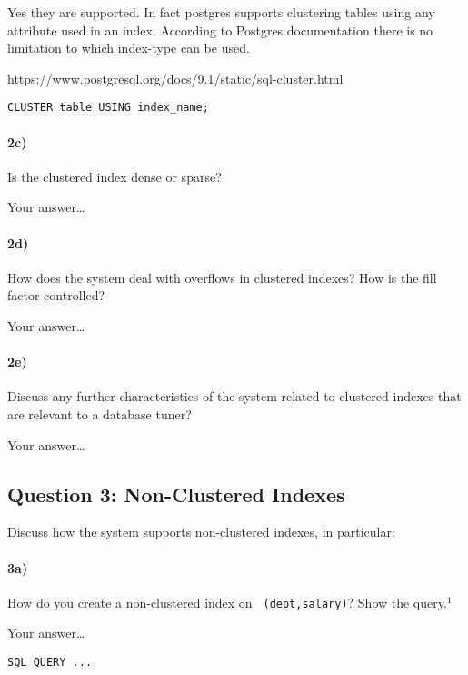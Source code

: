 \documentclass[11pt]{scrartcl}
\begin{document}
Yes they are supported. In fact postgres supports clustering tables using any attribute used in an index.
According to Postgres documentation there is no limitation to which index-type can be used.

https://www.postgresql.org/docs/9.1/static/sql-cluster.html

\begin{verbatim}
CLUSTER table USING index_name;
\end{verbatim}


\paragraph{2c)} Is the clustered index dense or sparse?


\smallskip

Your answer\dots

\paragraph{2d)} How does the system deal with overflows in clustered indexes?
How is the fill factor controlled?

\smallskip

Your answer\dots

\paragraph{2e)} Discuss any further characteristics of the system
related to clustered indexes that are relevant to a database
tuner?

\smallskip

Your answer\dots

\subsection*{Question 3: Non-Clustered Indexes}

Discuss how the system supports non-clustered indexes, in
particular:

\paragraph{3a)} How do you create a non-clustered index on {\tt
  (dept,salary)}? Show the query.$^1$

\smallskip

Your answer\dots

{\small
\begin{verbatim}
SQL QUERY ...
\end{verbatim}
}
\end{document}
